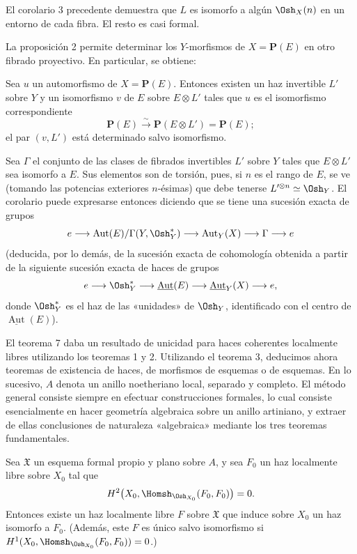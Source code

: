 El corolario 3 precedente demuestra que $L$ es isomorfo a algún $\Osh_X(n)$ en
un entorno de cada fibra. El resto es casi formal.

La proposición 2 permite determinar los $Y$-morfismos de $X=\mathbf P(E)$ en
otro fibrado proyectivo. En particular, se obtiene:

 Sea $u$ un automorfismo de $X=\mathbf P(E)$. Entonces
existen un haz invertible $L'$ sobre $Y$ y un isomorfismo $v$ de $E$ sobre
$E\otimes L'$ tales que $u$ es el isomorfismo correspondiente
\[
  \mathbf P(E)\xrightarrow{\sim}\mathbf P(E\otimes L')=\mathbf P(E);
\]
el par $(v,L')$ está determinado salvo isomorfismo.

Sea $\Gamma$ el conjunto de las clases de fibrados invertibles $L'$ sobre $Y$
tales que $E\otimes L'$ sea isomorfo a $E$. Sus elementos son de torsión, pues,
si $n$ es el rango de $E$, se ve (tomando las potencias exteriores $n$-ésimas)
que debe tenerse $L'^{\otimes n}\simeq\Osh_Y$. El corolario puede expresarse
entonces diciendo que se tiene una sucesión exacta de grupos
\[
  e\longrightarrow
  \operatorname{Aut}(E)/\Gamma(Y,\Osh_Y^*)
  \longrightarrow \operatorname{Aut}_Y(X)
  \longrightarrow \Gamma\longrightarrow e
\]
(deducida, por lo demás, de la sucesión exacta de cohomología obtenida a partir
de la siguiente sucesión exacta de haces de grupos
\[
  e\longrightarrow \Osh_Y^*
  \longrightarrow \underline{\operatorname{Aut}}(E)
  \longrightarrow \underline{\operatorname{Aut}}_Y(X)
  \longrightarrow e,
\]
donde $\Osh_Y^*$ es el haz de las «unidades» de $\Osh_Y$, identificado con el
centro de $\underline{\operatorname{Aut}}(E)$).


El teorema 7 daba un resultado de unicidad para haces coherentes localmente
libres utilizando los teoremas 1 y 2. Utilizando el teorema 3, deducimos ahora
teoremas de existencia de haces, de morfismos de esquemas o de esquemas. En lo
sucesivo, $A$ denota un anillo noetheriano local, separado y completo. El método
general consiste siempre en efectuar construcciones formales, lo cual consiste
esencialmente en hacer geometría algebraica sobre un anillo artiniano, y extraer
de ellas conclusiones de naturaleza «algebraica» mediante los tres teoremas
fundamentales.

 Sea $\mathfrak X$ un esquema formal propio y plano
sobre $A$, y sea $F_0$ un haz localmente libre sobre $X_0$ tal que
\[
  H^2\bigl(X_0,\Homsh_{\Osh_{X_0}}(F_0,F_0)\bigr)=0.
\]
Entonces existe un haz localmente libre $F$ sobre $\mathfrak X$ que induce
sobre $X_0$ un haz isomorfo a $F_0$. (Además, este $F$ es único salvo
isomorfismo si
$H^1(X_0,\Homsh_{\Osh_{X_0}}(F_0,F_0))=0$.)

